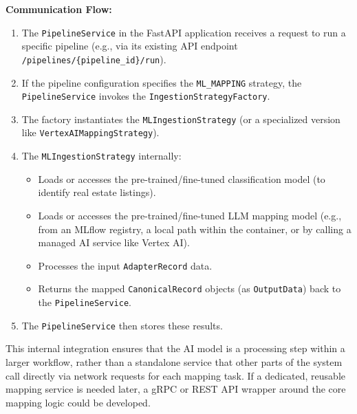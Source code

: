 \textbf{Communication Flow:}
\begin{enumerate}
    \item The \texttt{PipelineService} in the FastAPI application receives a request to run a specific pipeline (e.g., via its existing API endpoint \texttt{/pipelines/\{pipeline\_id\}/run}).
    \item If the pipeline configuration specifies the \texttt{ML\_MAPPING} strategy, the \texttt{PipelineService} invokes the \texttt{IngestionStrategyFactory}.
    \item The factory instantiates the \texttt{MLIngestionStrategy} (or a specialized version like \texttt{VertexAIMappingStrategy}).
    \item The \texttt{MLIngestionStrategy} internally:
        \begin{itemize}
            \item Loads or accesses the pre-trained/fine-tuned classification model (to identify real estate listings).
            \item Loads or accesses the pre-trained/fine-tuned LLM mapping model (e.g., from an MLflow registry, a local path within the container, or by calling a managed AI service like Vertex AI).
            \item Processes the input \texttt{AdapterRecord} data.
            \item Returns the mapped \texttt{CanonicalRecord} objects (as \texttt{OutputData}) back to the \texttt{PipelineService}.
        \end{itemize}
    \item The \texttt{PipelineService} then stores these results.
\end{enumerate}
This internal integration ensures that the AI model is a processing step within a larger workflow, rather than a standalone service that other parts of the system call directly via network requests for each mapping task. If a dedicated, reusable mapping service is needed later, a gRPC or REST API wrapper around the core mapping logic could be developed.

